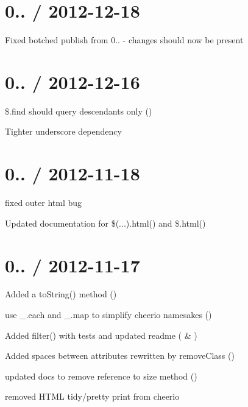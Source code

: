 \section*{0.. / 2012-\/12-\/18 }


\begin{DoxyItemize}
\item Fixed botched publish from 0.. -\/ changes should now be present
\end{DoxyItemize}

\section*{0.. / 2012-\/12-\/16 }


\begin{DoxyItemize}
\item \$.find should query descendants only ()
\item Tighter underscore dependency
\end{DoxyItemize}

\section*{0.. / 2012-\/11-\/18 }


\begin{DoxyItemize}
\item fixed outer html bug
\item Updated documentation for \$(...).html() and \$.html()
\end{DoxyItemize}

\section*{0.. / 2012-\/11-\/17 }


\begin{DoxyItemize}
\item Added a to\+String() method ()
\item use {\ttfamily \+\_\+.\+each} and {\ttfamily \+\_\+.\+map} to simplify cheerio namesakes ()
\item Added filter() with tests and updated readme ( \& )
\item Added spaces between attributes rewritten by remove\+Class ()
\item updated docs to remove reference to size method ()
\item removed H\+T\+ML tidy/pretty print from cheerio
\end{DoxyItemize}

